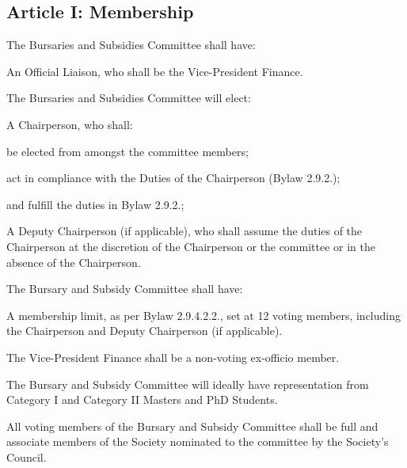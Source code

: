 \subsection{Article I: Membership}
\begin{longenum}[ label*=\thesubsection.\arabic*., align=left] 
	\item The Bursaries and Subsidies Committee shall have:
		\begin{longenum}[ label*=\arabic*., align=left] 
		\item An Official Liaison, who shall be the Vice-President Finance.
		\end{longenum}
	\item The Bursaries and Subsidies Committee will elect:
		\begin{longenum}[ label*=\arabic*., align=left]
		\item A Chairperson, who shall:
			\begin{longenum}[ label*=\arabic*., align=left]
			\item be elected from amongst the committee members;
			\item act in compliance with the Duties of the Chairperson (Bylaw 2.9.2.);
			\item and fulfill the duties in Bylaw 2.9.2.;
			\item A Deputy Chairperson (if applicable), who shall assume the duties of the Chairperson at the discretion of the Chairperson or the committee or in the absence of the Chairperson.
			\end{longenum}
		\end{longenum}
	\item The Bursary and Subsidy Committee shall have:
		\begin{longenum}[ label*=\arabic*., align=left]
		\item A membership limit, as per Bylaw 2.9.4.2.2., set at 12 voting members, including the Chairperson and Deputy Chairperson (if applicable).
		\end{longenum}
	\item The Vice-President Finance shall be a non-voting ex-officio member.
	\item The Bursary and Subsidy Committee will ideally have representation from Category I and Category II Masters and PhD Students.
	\item All voting members of the Bursary and Subsidy Committee shall be full and associate members of the Society nominated to the committee by the Society’s Council.     
\end{longenum}


